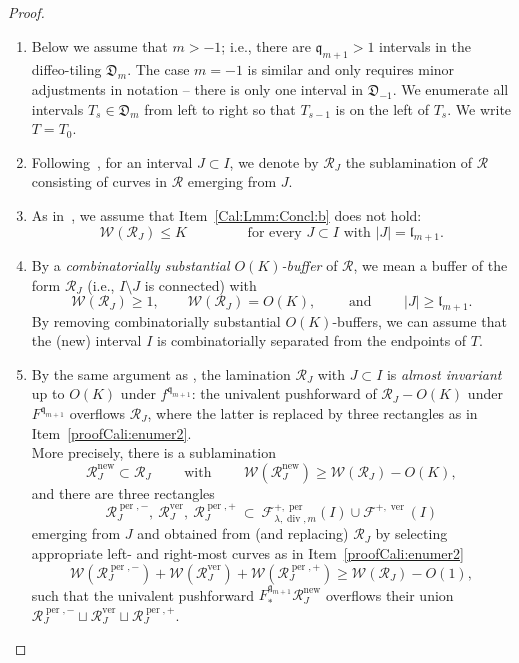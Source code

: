 \documentclass{amsart}
\newcommand{\1}{{\mathbb 1 }}
\renewcommand{\div}{{\operatorname{div}}}
\newcommand{\Fam}{{\mathcal F}}
\newcommand{\Width}{{\mathcal W}}
\newcommand\RR{\mathcal{R}}
\newcommand{\qq}{\mathfrak{q}}
\newcommand{\length}{{\mathfrak l}}
\newcommand\new{{\operatorname{new}}}
\newcommand\ver{{\operatorname{ver}}}
\newcommand\per{{\operatorname{per}}}
\newcommand{\Dbb}{{\mathfrak{D}}}
\theoremstyle{remark}
\numberwithin{equation}{section}
\theoremstyle{definition}
\begin{document}
\begin{proof}
\begin{enumerate}[label=\text{(\arabic*)},font=\normalfont,leftmargin=*]
   \item Below we assume that $m>-1$; i.e., there are $\qq_{m+1}>1$ intervals in the diffeo-tiling $\Dbb_m$. The case $m=-1$ is similar and only requires minor adjustments in notation -- there is only one interval in $\Dbb_{-1}$. We enumerate all intervals $T_s\in \Dbb_m$ from left to right so that $T_{s-1}$ is on the left of $T_s$. We write $T=T_0$.

\item\label{proofCali:enumer:RR_J} Following~\cite[\S~9.1.2]{DL22}, for an interval $J\subset I$, we denote by $\RR_J$ the sublamination of $\RR$ consisting of curves in $\RR$ emerging from $J$.
    
    \item\label{proofCali:enumer:4} As in~\cite[\S9.1.2]{DL22}, we assume that Item~\ref{Cal:Lmm:Concl:b} does not hold:
     \begin{equation}
         \label{eq:assump:proofCali:enumer:4} \Width(\RR_J)\le K\qquad\qquad \text{ for every $J\subset I$ with $|J|=\length_{m+1}$}.
     \end{equation}
     
    \item\label{proofCali:enumer:O(K)-buff} By a \emph{combinatorially substantial $O(K)$-buffer} of $\RR$, we mean a buffer of the form $\RR_J$ (i.e., $I\setminus J$ is connected) with \[ \Width(\RR_J)\ge 1, \qquad \Width(\RR_J)=O(K),\qquad \text{ and } \qquad |J|\ge \length_{m+1}.\] By removing combinatorially substantial $O(K)$-buffers, we can assume that the (new) interval $I$ is combinatorially separated from the endpoints of $T$. 
    
    \item\label{proofCali:enumer:AlmInvar}  By the same argument as \cite[Claim 3 in \S~9]{DL22}, the lamination $\RR_J$ with $J\subset I$ is \emph{almost invariant} up to $O(K)$ under $f^{\qq_{m+1}}$: the univalent pushforward of $\RR_J-O(K)$ under $F^{\qq_{m+1}}$ overflows $\RR_J$, where the latter is replaced by three rectangles as in Item~\ref{proofCali:enumer2}. 
    \\ More precisely, there is a sublamination \[\RR^\new_J\subset \RR_J\qquad\text{ with } \qquad \Width(\RR_J^\new)\ge \Width(\RR_J)-O(K),\]
    and there are three rectangles 
    \[\RR_J^{\per,-},\ \RR_J^\ver,\ \RR_J^{\per,+}\ \subset \ \Fam^{+,\per}_{\lambda, \div,m}(I)\cup \Fam^{+,\ver}(I)\] emerging from $J$ and obtained from (and replacing) $\RR_J$ by selecting appropriate left- and right-most curves as in Item~\ref{proofCali:enumer2}
   \[
       \Width(\RR^{\per,-}_J)+\Width(\RR^{\ver}_J)+ \Width(\RR^{\per,+}_J)\ge \Width(\RR_J) -O(1),
   \] 
        such that the univalent pushforward $F^{\qq_{m+1}}_* \RR^\new_J$ overflows their union $\RR_J^{\per,-}\sqcup \RR_J^\ver\sqcup \RR_J^{\per,+}$.
       \end{enumerate}


\end{proof}
\end{document}
